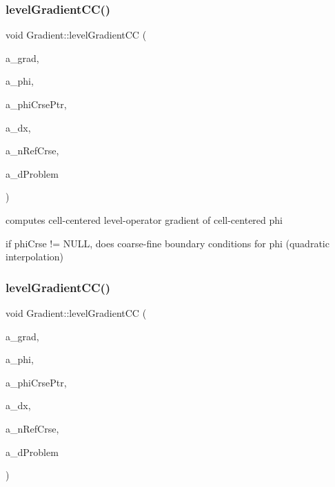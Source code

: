 \subsubsection{\texorpdfstring{level\+Gradient\+C\+C()}{levelGradientCC()}\hspace{0.1cm}{\footnotesize\ttfamily [1/6]}}
{\footnotesize\ttfamily void Gradient\+::level\+Gradient\+CC (\begin{DoxyParamCaption}\item[{\textbf{ Level\+Data}$<$ \textbf{ F\+Array\+Box} $>$ \&}]{a\+\_\+grad,  }\item[{\textbf{ Level\+Data}$<$ \textbf{ F\+Array\+Box} $>$ \&}]{a\+\_\+phi,  }\item[{const \textbf{ Level\+Data}$<$ \textbf{ F\+Array\+Box} $>$ $\ast$}]{a\+\_\+phi\+Crse\+Ptr,  }\item[{const \textbf{ Real}}]{a\+\_\+dx,  }\item[{const int}]{a\+\_\+n\+Ref\+Crse,  }\item[{const \textbf{ Problem\+Domain} \&}]{a\+\_\+d\+Problem }\end{DoxyParamCaption})\hspace{0.3cm}{\ttfamily [static]}}



computes cell-\/centered level-\/operator gradient of cell-\/centered phi 

if phi\+Crse != N\+U\+LL, does coarse-\/fine boundary conditions for phi (quadratic interpolation) \mbox{\label{class_gradient_a9e85cf629d0e4b0ad7809c0db1f0322c}} 
\subsubsection{\texorpdfstring{level\+Gradient\+C\+C()}{levelGradientCC()}\hspace{0.1cm}{\footnotesize\ttfamily [2/6]}}
{\footnotesize\ttfamily void Gradient\+::level\+Gradient\+CC (\begin{DoxyParamCaption}\item[{\textbf{ Level\+Data}$<$ \textbf{ F\+Array\+Box} $>$ \&}]{a\+\_\+grad,  }\item[{\textbf{ Level\+Data}$<$ \textbf{ F\+Array\+Box} $>$ \&}]{a\+\_\+phi,  }\item[{const \textbf{ Level\+Data}$<$ \textbf{ F\+Array\+Box} $>$ $\ast$}]{a\+\_\+phi\+Crse\+Ptr,  }\item[{const \textbf{ Real}}]{a\+\_\+dx,  }\item[{const int}]{a\+\_\+n\+Ref\+Crse,  }\item[{const \textbf{ Box} \&}]{a\+\_\+d\+Problem }\end{DoxyParamCaption})\hspace{0.3cm}{\ttfamily [static]}}



